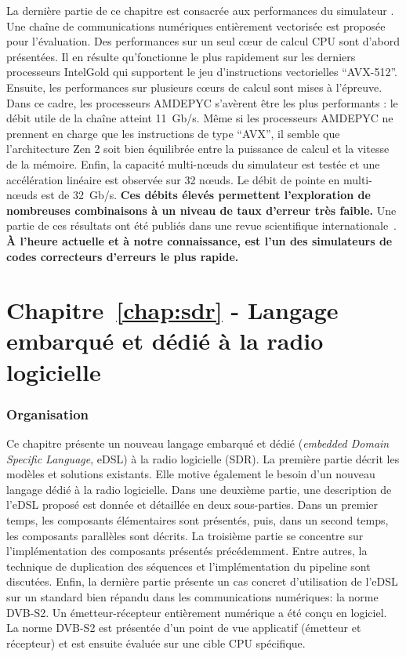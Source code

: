La dernière partie de ce chapitre est consacrée aux performances du simulateur
\AFFECT. Une chaîne de communications numériques entièrement vectorisée est
proposée pour l'évaluation. Des performances sur un seul cœur de calcul CPU sont
d'abord présentées. Il en résulte qu'\AFFECT fonctionne le plus rapidement sur
les derniers processeurs Intel\R Gold qui supportent le jeu d'instructions
vectorielles ``AVX-512''. Ensuite, les performances sur plusieurs cœurs de
calcul sont mises à l'épreuve. Dans ce cadre, les processeurs AMD\R EPYC
s'avèrent être les plus performants : le débit utile de la chaîne atteint
11~Gb/s. Même si les processeurs AMD\R EPYC ne prennent en charge que les
instructions de type ``AVX'', il semble que l'architecture Zen 2 soit bien
équilibrée entre la puissance de calcul et la vitesse de la mémoire. Enfin, la
capacité multi-nœuds du simulateur \AFFECT est testée et une accélération
linéaire est observée sur 32 nœuds. Le débit de pointe en multi-nœuds est de
32~Gb/s. \textbf{Ces débits élevés permettent l'exploration de nombreuses
combinaisons à un niveau de taux d'erreur très faible.} Une partie de ces
résultats ont été publiés dans une revue scientifique
internationale~\cite{Cassagne2019a}. \textbf{À l'heure actuelle et à notre
connaissance, \AFFECT est l'un des simulateurs de codes correcteurs d'erreurs le
plus rapide.}

\section*{Chapitre~\ref{chap:sdr} - Langage embarqué et dédié à la radio logicielle}

\subsubsection*{Organisation}

Ce chapitre présente un nouveau langage embarqué et dédié (\emph{embedded Domain
Specific Language}, eDSL) à la radio logicielle (SDR). La première partie
décrit les modèles et solutions existants. Elle motive également le besoin
d'un nouveau langage dédié à la radio logicielle. Dans une deuxième partie, une
description de l'eDSL proposé est donnée et détaillée en deux sous-parties. Dans
un premier temps, les composants élémentaires sont présentés, puis, dans un
second temps, les composants parallèles sont décrits. La troisième partie se
concentre sur l'implémentation des composants présentés précédemment. Entre
autres, la technique de duplication des séquences et l'implémentation du
pipeline sont discutées. Enfin, la dernière partie présente un cas concret
d'utilisation de l'eDSL sur un standard bien répandu dans les communications
numériques: la norme DVB-S2. Un émetteur-récepteur entièrement numérique a été
conçu en logiciel. La norme DVB-S2 est présentée d'un point de vue applicatif
(émetteur et récepteur) et est ensuite évaluée sur une cible CPU spécifique.

